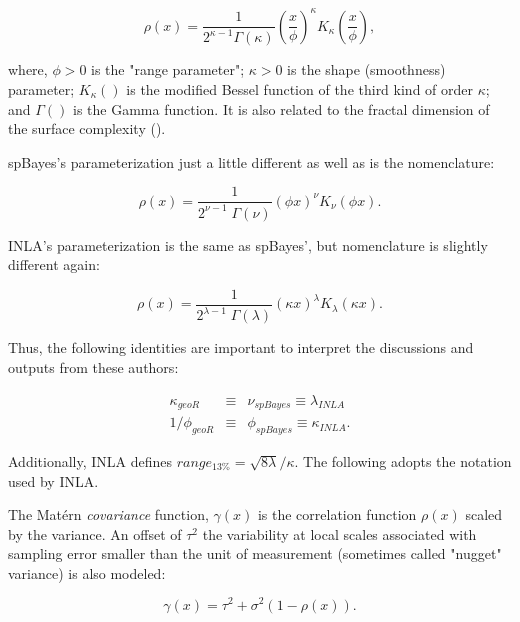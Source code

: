 \documentclass[letterpaper,portrait,11pt]{scrartcl}
\numberwithin{equation}{section}    %
\numberwithin{figure}{section}    %
\numberwithin{table}{section}       %
\begin{document}
\begin{appendices}
\begin{equation}
    \rho(x) = \frac{1}{2^{\kappa-1} \Gamma(\kappa)}
    {\left( \frac{x}{\phi} \right)  }^{\kappa} K_{\kappa}\left( \frac{x}{\phi} \right),
\end{equation}

where, $\phi > 0$ is the "range parameter";  $\kappa > 0$ is the shape (smoothness) parameter; $K_{\kappa}()$ is the modified Bessel function of the third kind of order $\kappa$; and $\Gamma()$ is the Gamma function. It is also related to the fractal dimension of the surface complexity (\cite{Schepers:2002:fractals, constantine:1994}).

spBayes's \parencite{finley:2007} parameterization just a little different as well as is the nomenclature:

\begin{equation}
\rho(x) = \frac{ 1 }{ 2^{\nu-1} \; \Gamma(\nu) }  \left( \phi x \right) ^{\nu} K_{\nu} \left( \phi x  \right).
\end{equation}


INLA's \parencite{rinla:2015} parameterization is the same as spBayes', but nomenclature is slightly different again:

\begin{equation}
  \rho(x) = \frac{ 1 }{ 2^{\lambda-1} \; \Gamma(\lambda) }  \left( \kappa x \right) ^{\lambda} K_{\lambda} \left( \kappa x  \right) .
\end{equation}

Thus, the following identities are important to interpret the discussions and outputs from these authors:

\begin{eqnarray*}
  \kappa_{geoR} &\equiv& \nu_{spBayes}  \equiv  \lambda_{INLA} \\
  1/\phi_{geoR} &\equiv& \phi_{spBayes} \equiv \kappa_{INLA}.
\end{eqnarray*}


Additionally, INLA defines $range_{13\%} = \sqrt{8 \lambda} / \kappa$. The following adopts the notation used by INLA.

The Mat\'{e}rn \textit{covariance} function, $\gamma(x)$ is the correlation function $\rho(x)$ scaled by the variance. An offset of $\tau^2$ the variability at local scales associated with sampling error smaller than the unit of measurement (sometimes called "nugget" variance) is also modeled:

\begin{equation*}
\gamma(x) = \tau^2 + \sigma^2 ( 1- \rho(x)) .
\end{equation*}



\end{appendices}
\end{document}
